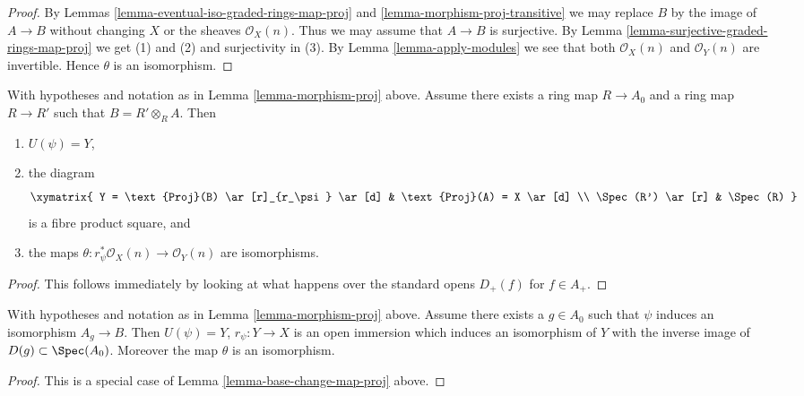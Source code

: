 \begin{proof}
By Lemmas \ref{lemma-eventual-iso-graded-rings-map-proj} and
\ref{lemma-morphism-proj-transitive}
we may replace $B$ by the image of $A \to B$
without changing $X$ or the sheaves $\mathcal{O}_X(n)$.
Thus we may assume that $A \to B$ is surjective. By
Lemma \ref{lemma-surjective-graded-rings-map-proj} we get (1) and (2)
and surjectivity in (3).
By Lemma \ref{lemma-apply-modules} we see that both
$\mathcal{O}_X(n)$ and $\mathcal{O}_Y(n)$
are invertible. Hence $\theta$ is an isomorphism.
\end{proof}

\begin{lemma}
\label{lemma-base-change-map-proj}
With hypotheses and notation as in Lemma \ref{lemma-morphism-proj} above.
Assume there exists a ring map $R \to A_0$ and a ring map
$R \to R'$ such that $B = R' \otimes_R A$. Then
\begin{enumerate}
\item $U(\psi) = Y$,
\item the diagram
$$
\xymatrix{
Y = \text{Proj}(B) \ar[r]_{r_\psi} \ar[d] &
\text{Proj}(A) = X \ar[d] \\
\Spec(R') \ar[r] &
\Spec(R)
}
$$
is a fibre product square, and
\item the maps $\theta : r_\psi^*\mathcal{O}_X(n) \to \mathcal{O}_Y(n)$
are isomorphisms.
\end{enumerate}
\end{lemma}

\begin{proof}
This follows immediately by looking at what happens over the standard
opens $D_{+}(f)$ for $f \in A_{+}$.
\end{proof}

\begin{lemma}
\label{lemma-localization-map-proj}
With hypotheses and notation as in Lemma \ref{lemma-morphism-proj} above.
Assume there exists a $g \in A_0$ such that $\psi$ induces an
isomorphism $A_g \to B$. Then
$U(\psi) = Y$, $r_\psi : Y \to X$ is an open immersion
which induces an isomorphism of $Y$ with the inverse image
of $D(g) \subset \Spec(A_0)$. Moreover the map $\theta$
is an isomorphism.
\end{lemma}

\begin{proof}
This is a special case of Lemma \ref{lemma-base-change-map-proj} above.
\end{proof}











